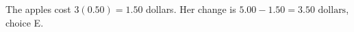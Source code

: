 The apples cost $3(0.50)=1.50$ dollars. Her change is $5.00-1.50=\boxed{3.50\text{ dollars}}$, choice E.
